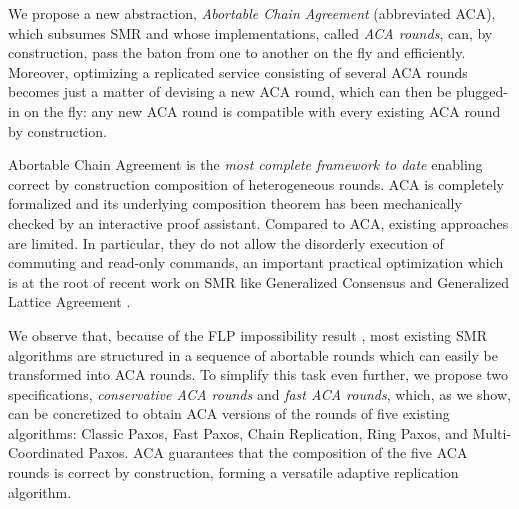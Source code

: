 We propose a new abstraction, \emph{Abortable Chain Agreement}
(abbreviated ACA), which subsumes SMR and whose implementations,
called \emph{ACA rounds}, can, by construction, pass the baton from
one to another on the fly and efficiently. Moreover, optimizing a replicated
service consisting of several ACA rounds becomes just a matter of devising a new
ACA round, which can then be plugged-in on the fly: any new ACA round
is compatible with every existing ACA round by construction.

Abortable Chain Agreement is the \emph{most complete framework to date} enabling
correct by construction composition of heterogeneous rounds.  
ACA is completely formalized and its underlying composition theorem has been
mechanically checked by an interactive proof assistant.  
Compared to ACA,
existing approaches
\cite{BarNoyETAL87ShiftingGearsChangingAlgorithmsFlyTo,GuerraouiETAL10Next700BftProtocols,GuerraouiKuncakLosa12SpeculativeLinearizability}
are limited. In particular, they do not allow the disorderly execution of
commuting and read-only commands, an important practical optimization
which is at the root of recent work on SMR like Generalized Consensus
\cite{Lamport05GeneralizeConsensus} and Generalized Lattice Agreement
\cite{FalerioETAL12GeneralizedLatticeAgreement}.

\begin{comment}
On top of the traditional roles of proposer, acceptor, and learners
\cite{lamport2001paxos} used in consensus algorithms, ACA introduces
the notion of \emph{switchers} and of \emph{scheduling policy}. The switchers
have the task of aborting a running ACA round and initializing a new
ACA round in a safe and live manner.  The \emph{scheduling policy}
decides when to abort an ACA round and choses the next ACA round to
execute. It must ensure that all switchers agree on the next ACA round
to initialize.
\end{comment}

We observe that, because of the FLP impossibility result
\cite{FischerLynchPaterson83ImpossibilityDistributedConsensusOneFaultyProcess},
most existing SMR algorithms are structured in a sequence of abortable
rounds which can easily be transformed into ACA rounds. To simplify
this task even further, we propose two specifications, \emph{conservative
ACA rounds} and \emph{fast ACA rounds}, which, as we show, can be concretized
to obtain ACA versions of the rounds of five existing algorithms: 
Classic Paxos, Fast Paxos, Chain Replication, Ring Paxos,
and Multi-Coordinated Paxos. ACA guarantees that the composition of the five ACA
rounds is correct by construction, forming a versatile adaptive replication
algorithm. 

